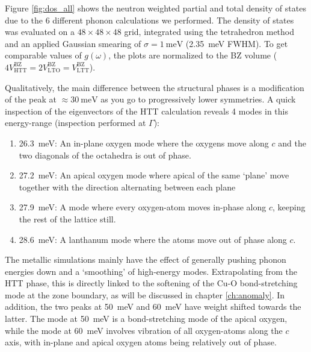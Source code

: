 Figure \ref{fig:dos_all} shows the neutron weighted partial and total density of states due to the 6 different phonon calculations we performed. The density of states was evaluated on a $48 \times 48 \times 48$ grid, integrated using the tetrahedron method and an applied Gaussian smearing of $\sigma=\SI{1}{\milli\eV}$ (\SI{2.35}{\milli\eV} FWHM). To get comparable values of $g(\omega)$, the plots are normalized to the BZ volume ($4V^\text{BZ}_\text{HTT} = 2 V^\text{BZ}_\text{LTO} = V^\text{BZ}_\text{LTT}$).

Qualitatively, the main difference between the structural phases is a modification of the peak at $\approx \SI{30}{\milli\eV}$ as you go to progressively lower symmetries. A quick inspection of the eigenvectors of the HTT calculation reveals 4 modes in this energy-range (inspection performed at $\Gamma$):

\begin{enumerate}
	\item \SI{26.3}{\milli\eV}: An in-plane oxygen mode where the oxygens move along $c$ and the two diagonals of the octahedra is out of phase.
	\item \SI{27.2}{\milli\eV}: An apical oxygen mode where apical of the same `plane' move together with the direction alternating between each plane
	\item \SI{27.9}{\milli\eV}: A mode where every oxygen-atom moves in-phase along $c$, keeping the rest of the lattice still.
	\item \SI{28.6}{\milli\eV}: A lanthanum mode where the atoms move out of phase along $c$.
\end{enumerate}

The metallic simulations mainly have the effect of generally pushing phonon energies down and a `smoothing' of high-energy modes. Extrapolating from the HTT phase, this is directly linked to the softening of the Cu-O bond-stretching mode at the zone boundary, as will be discussed in chapter \ref{ch:anomaly}. In addition, the two peaks at \SI{50}{\milli\eV} and \SI{60}{\milli\eV} have weight shifted towards the latter. The mode at \SI{50}{\milli\eV} is a bond-stretching mode of the apical oxygen, while the mode at \SI{60}{\milli\eV} involves vibration of all oxygen-atoms along the $c$ axis, with in-plane and apical oxygen atoms being relatively out of phase.

